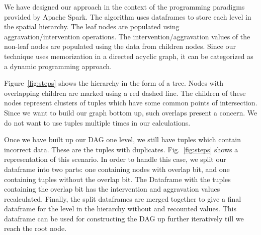 We have designed our approach in the context of the programming paradigms provided by Apache Spark. 
The algorithm uses dataframes to store each level in the spatial hierarchy. 
The leaf nodes are populated using aggravation/intervention operations. 
The intervention/aggravation values of the non-leaf nodes are populated using the data from children nodes. 
Since our technique uses memorization in a directed acyclic graph, it can be categorized as a dynamic programming approach.

Figure~\ref{fig:steps} shows the hierarchy in the form of a tree. 
Nodes with overlapping children are marked using a red dashed line. 
The children of these nodes represent clusters of tuples which have some common points of intersection. 
Since we want to build our graph bottom up, such overlaps present a concern. 
We do not want to use tuples multiple times in our calculations.



Once we have built up our DAG one level, we still have tuples which contain incorrect data. These are the tuples with duplicates. Fig.~\ref{fig:steps} shows a representation of this scenario. In order to handle this case, we split our dataframe into two parts: one containing nodes with overlap bit, and one containing tuples without the overlap bit. The Dataframe with the tuples containing the overlap bit has the intervention and aggravation values recalculated. Finally, the split dataframes are merged together to give a final dataframe for the level in the hierarchy without and recounted values. This dataframe can be used for constructing the DAG up further iteratively till we reach the root node.

